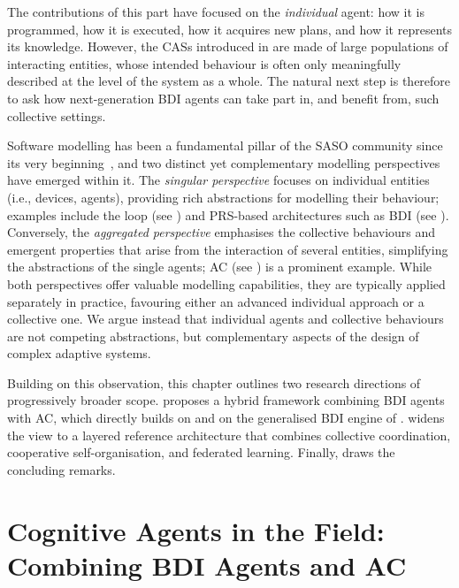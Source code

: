 The contributions of this part have focused on the \emph{individual} agent:
how it is programmed,
how it is executed,
how it acquires new plans,
and how it represents its knowledge.
%
However,
the \acp{CAS} introduced in 
are made of large populations of interacting entities,
whose intended behaviour is often only meaningfully described at the level of the system as a whole.
%
The natural next step is therefore to ask
how next-generation \ac{BDI} agents can take part in,
and benefit from,
such collective settings.

Software modelling has been a fundamental pillar of the \ac{SASO} community since its very beginning~\cite{karsai1999saso},
and two distinct yet complementary modelling perspectives have emerged within it.
%
The \emph{singular perspective}
focuses on individual entities (i.e., devices, agents),
providing rich abstractions for modelling their behaviour;
examples include the \mapek{} loop (see )
and \ac{PRS}-based architectures such as \ac{BDI} (see ).
%
Conversely,
the \emph{aggregated perspective}
emphasises the collective behaviours and emergent properties
that arise from the interaction of several entities,
simplifying the abstractions of the single agents;
\ac{AC} (see ) is a prominent example.
%
While both perspectives offer valuable modelling capabilities,
they are typically applied separately in practice,
favouring either an advanced individual approach or a collective one.
%
We argue instead that individual agents and collective behaviours
are not competing abstractions,
but complementary aspects of the design of complex adaptive systems.

Building on this observation,
this chapter outlines two research directions
of progressively broader scope.
%
proposes a hybrid framework combining \ac{BDI} agents with \ac{AC},
which directly builds on \jakta{} and on the generalised \ac{BDI} engine of .
%
widens the view to a layered reference architecture
that combines collective coordination,
cooperative self-organisation,
and federated learning.
%
Finally,
 draws the concluding remarks.

\section{Cognitive Agents in the Field: Combining \acs{BDI} Agents and \acl{AC}}
\label{sec:perspectives-bdi-ac}

